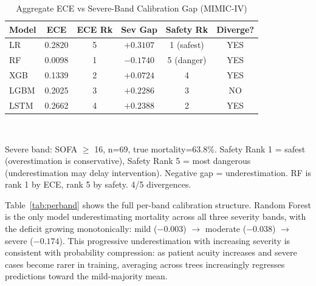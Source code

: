 \documentclass{ieeeaccess}
\begin{document}
\begin{table}[t!]
\caption{Aggregate ECE vs Severe-Band Calibration Gap (MIMIC-IV)}
\label{tab:ece_vs_severe}
\centering
\footnotesize
\setlength{\tabcolsep}{2.5pt}
\begin{tabularx}{\columnwidth}{@{}lccccc@{}}
\toprule
\textbf{Model} & \textbf{ECE} & \textbf{ECE Rk} & \textbf{Sev Gap} & \textbf{Safety Rk} & \textbf{Diverge?} \\
\midrule
LR   & 0.2820 & 5 & $+0.3107$ & 1 (safest) & YES \\
RF   & 0.0098 & 1 & $-0.1740$ & 5 (danger) & YES \\
XGB  & 0.1339 & 2 & $+0.0724$ & 4 & YES \\
LGBM & 0.2025 & 3 & $+0.2286$ & 3 & NO  \\
LSTM & 0.2662 & 4 & $+0.2388$ & 2 & YES \\
\bottomrule
\end{tabularx}
\\[4pt]
\parbox{\columnwidth}{\footnotesize Severe band: SOFA $\ge$ 16, n=69, true mortality=63.8\%. Safety Rank 1 = safest (overestimation is conservative), Safety Rank 5 = most dangerous (underestimation may delay intervention). Negative gap = underestimation. RF is rank 1 by ECE, rank 5 by safety. 4/5 divergences.}
\end{table}

Table~\ref{tab:perband} shows the full per-band calibration structure. Random Forest is the only model underestimating mortality across all three severity bands, with the deficit growing monotonically: mild ($-0.003$) $\rightarrow$ moderate ($-0.038$) $\rightarrow$ severe ($-0.174$). This progressive underestimation with increasing severity is consistent with probability compression: as patient acuity increases and severe cases become rarer in training, averaging across trees increasingly regresses predictions toward the mild-majority mean.
\end{document}
